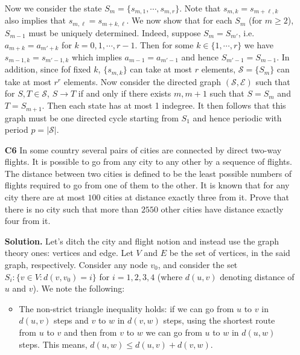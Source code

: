 \documentclass[11pt,a4paper]{article}
\begin{document}
\begin{enumerate}
	Now we consider the state $S_m = \{s_{m, 1}, \cdots, s_{m, r}\}$. 
	Note that $s_{m, k}=s_{m+\ell, k}$ also implies that $s_{m, \ell}=s_{m+k, \ell}$. 
	We now show that for each $S_m$ (for $m\ge 2$), $S_{m-1}$ must be uniquely determined. 
	Indeed, suppose $S_m=S_{m'}$, i.e. $a_{m+k}=a_{m'+k}$ for $k=0, 1, \cdots, r - 1$. 
	Then for some $k\in\{1, \cdots, r\}$ we have $s_{m-1,k}=s_{m'-1, k}$ which implies $a_{m-1}=a_{m'-1}$ and hence $S_{m'-1}=S_{m-1}$. 
	In addition, since fof fixed $k$, $\{s_{m, k}\}$ can take at most $r$ elements, 
	$\mathcal{S}=\{S_m\}$ can take at most $r^r$ elements. 
	Now consider the directed graph $(\mathcal{S}, \mathcal{E})$ such that for $S, T\in\mathcal{S}$, $S\to T$ if and only if there exists $m, m+1$ such that $S=S_m$ and $T=S_{m+1}$. 
	Then each state has at most 1 indegree. It then follows that this graph must be one directed cycle starting from $S_1$ and hence periodic with period $p=|\mathcal{S}|$. 
	
	\item[\textbf{C6}] In some country several pairs of cities are connected by direct two-way flights. It is possible to go from any city to any other by a sequence of flights. The distance between two cities is defined to be the least possible numbers of flights required to go from one of them to the other. It is known that for any city there are at most $100$ cities at distance exactly three from it. Prove that there is no city such that more than $2550$ other cities have distance exactly four from it.
	
	\textbf{Solution.} Let's ditch the city and flight notion and instead use the graph theory ones: vertices and edge. Let $V$ and $E$ be the set of vertices, in the said graph, respectively. Consider any node $v_0$, and consider the set $S_i: \{v\in V: d(v, v_0)=i\}$ for $i=1, 2, 3, 4$ (where $d(u, v)$ denoting distance of $u$ and $v$). We note the following: 
	\begin{itemize}
		\item The non-strict triangle inequality holds: if we can go from $u$ to $v$ in $d(u, v)$ steps and $v$ to $w$ in $d(v, w)$ steps, using the shortest route from $u$ to $v$ and then from $v$ to $w$ we can go from $u$ to $w$ in $d(u, w)$ steps. This means, $d(u, w)\le d(u, v)+d(v, w)$. 
		

\end{itemize}
\end{enumerate}
\end{document}
